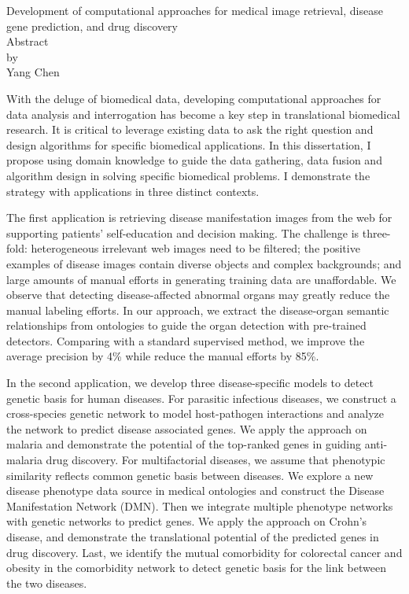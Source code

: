 \newpage
\begin{centering}
  Development of computational approaches for medical image retrieval, disease gene prediction, and drug discovery\\
  \vspace{1cm}
  Abstract\\
  by\\
  \vspace{1cm}
  Yang Chen\\
  \vspace{1cm}
\end{centering}



With the deluge of biomedical data, developing computational approaches for data analysis and interrogation has become a key step in translational biomedical research. It is critical to leverage existing data to ask the right question and design algorithms for specific biomedical applications. In this dissertation, I propose using domain knowledge to guide the data gathering, data fusion and algorithm design in solving specific biomedical problems. I demonstrate the strategy with applications in three distinct contexts.

The first application is retrieving disease manifestation images from the web for supporting patients' self-education and decision making. The challenge is three-fold: heterogeneous irrelevant web images need to be filtered; the positive examples of disease images contain diverse objects and complex backgrounds; and large amounts of manual efforts in generating training data are unaffordable. We observe that detecting disease-affected abnormal organs may greatly reduce the manual labeling efforts. In our approach, we extract the disease-organ semantic relationships from ontologies to guide the organ detection with pre-trained detectors. Comparing with a standard supervised method, we improve the average precision by 4\% while reduce the manual efforts by 85\%.

In the second application, we develop three disease-specific models to detect genetic basis for human diseases. For parasitic infectious diseases, we construct a cross-species genetic network to model host-pathogen interactions and analyze the network to predict disease associated genes. We apply the approach on malaria and demonstrate the potential of the top-ranked genes in guiding anti-malaria drug discovery. For multifactorial diseases, we assume that phenotypic similarity reflects common genetic basis between diseases. We explore a new disease phenotype data source in medical ontologies and construct the Disease Manifestation Network (DMN). Then we integrate multiple phenotype networks with genetic networks to predict genes. We apply the approach on Crohn's disease, and demonstrate the translational potential of the predicted genes in drug discovery. Last, we identify the mutual comorbidity for colorectal cancer and obesity in the comorbidity network to detect genetic basis for the link between the two diseases.

